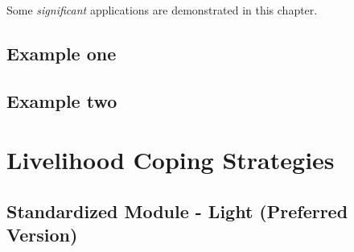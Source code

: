 \documentclass[
]{article}
\begin{document}
Some \emph{significant} applications are demonstrated in this chapter.

\hypertarget{example-one}{%
\subsection{Example one}\label{example-one}}

\hypertarget{example-two}{%
\subsection{Example two}\label{example-two}}

\hypertarget{livelihood-coping-strategies}{%
\section{Livelihood Coping Strategies}\label{livelihood-coping-strategies}}

\hypertarget{standardized-module---light-preferred-version}{%
\subsection{Standardized Module - Light (Preferred Version)}\label{standardized-module---light-preferred-version}}
\end{document}
